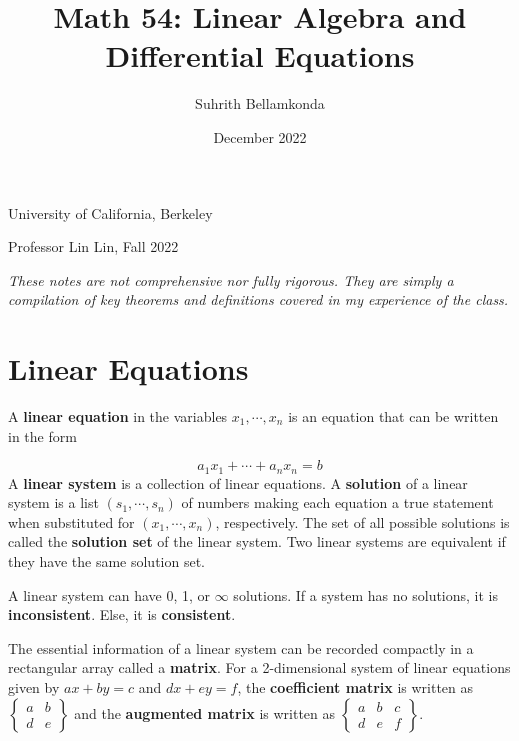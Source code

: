 \documentclass{article}
\title{\textbf{Math 54: Linear Algebra and Differential Equations}}
\author{Suhrith Bellamkonda}
\date{December 2022}
\begin{document}
\maketitle{}
\begin{center}
    University of California, Berkeley
\end{center}
\begin{center}
    Professor Lin Lin, Fall 2022
\end{center}
\textit{These notes are not comprehensive nor fully rigorous. They are simply a compilation of  key theorems and definitions covered in my experience of the class.}

\section{Linear Equations}

A \textbf{linear equation} in the variables $x_1,\cdots,x_n$ is an equation that can be written in the form

\begin{equation}
a_1x_1+\cdots+a_nx_n = b 
\end{equation}
\hfill \newline
A \textbf{linear system} is a collection of linear equations. A \textbf{solution} of a linear system is a list $(s_1,\cdots,s_n)$ of numbers making each equation a true statement when substituted for $(x_1,\cdots,x_n)$, respectively. The set of all possible solutions is called the \textbf{solution set} of the linear system. Two linear systems are equivalent if they have the same solution set.

\hfill \newline
A linear system can have 0, 1, or $\infty$ solutions. If a system has no solutions, it is \textbf{inconsistent}. Else, it is \textbf{consistent}.

\hfill \newline The essential information of a linear system can be recorded compactly in a rectangular array called a \textbf{matrix}. For a 2-dimensional system of linear equations given by $ax+by=c$ and $dx+ey=f$, the \textbf{coefficient matrix} is written as 
$\begin{Bmatrix}
a & b\\
d & e
\end{Bmatrix}$
and the \textbf{augmented matrix} is written as
$\begin{Bmatrix}
a & b & c\\
d & e & f
\end{Bmatrix}.$
\end{document}
